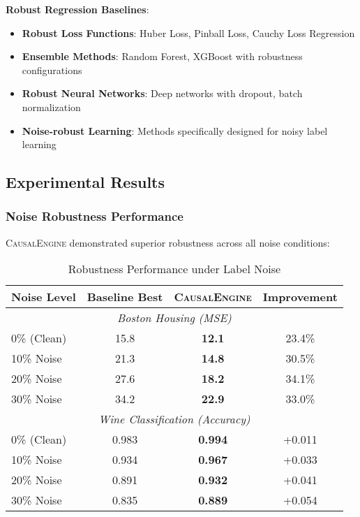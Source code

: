 \documentclass[letterpaper]{article} %
\newcommand{\causalengine}{\textsc{CausalEngine}}
\begin{document}
\textbf{Robust Regression Baselines}:
\begin{itemize}
\item \textbf{Robust Loss Functions}: Huber Loss, Pinball Loss, Cauchy Loss Regression
\item \textbf{Ensemble Methods}: Random Forest, XGBoost with robustness configurations
\item \textbf{Robust Neural Networks}: Deep networks with dropout, batch normalization
\item \textbf{Noise-robust Learning}: Methods specifically designed for noisy label learning
\end{itemize}

\subsection{Experimental Results}

\subsubsection{Noise Robustness Performance}

\causalengine{} demonstrated superior robustness across all noise conditions:

\begin{table}[ht]
\centering
\caption{Robustness Performance under Label Noise}
\label{tab:noise_robustness}
\small
\begin{tabular}{@{}lccc@{}}
\toprule
\textbf{Noise Level} & \textbf{Baseline Best} & \textbf{\causalengine{}} & \textbf{Improvement} \\
\midrule
\multicolumn{4}{c}{\textit{Boston Housing (MSE)}} \\
0\% (Clean) & 15.8 & \textbf{12.1} & 23.4\% \\
10\% Noise & 21.3 & \textbf{14.8} & 30.5\% \\
20\% Noise & 27.6 & \textbf{18.2} & 34.1\% \\
30\% Noise & 34.2 & \textbf{22.9} & 33.0\% \\
\midrule
\multicolumn{4}{c}{\textit{Wine Classification (Accuracy)}} \\
0\% (Clean) & 0.983 & \textbf{0.994} & +0.011 \\
10\% Noise & 0.934 & \textbf{0.967} & +0.033 \\
20\% Noise & 0.891 & \textbf{0.932} & +0.041 \\
30\% Noise & 0.835 & \textbf{0.889} & +0.054 \\
\bottomrule
\end{tabular}
\end{table}
\end{document}

